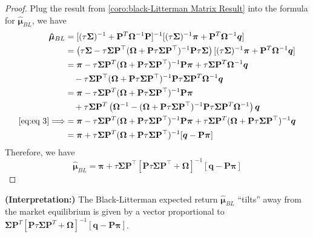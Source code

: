 \documentclass[13pt]{article}
\theoremstyle{definition}
\theoremstyle{remark}
\newenvironment{remark}
  {\pushQED{\qed}\renewcommand{\qedsymbol}{$\triangle$}\remarkx}
  {\popQED\endremarkx}
\begin{document}
\begin{proof}
Plug the result from   \cref{coro:black-Litterman Matrix Result} into the formula for $\bm{\hat{\bm{\mu}}}_{BL}$, we have
\begin{align*}
\bm{\hat{\bm{\mu}}}_{BL}
&=[(\tau \mathbf{\Sigma})^{-1}+\mathbf{P}^T\mathbf{\Omega}^{-1}\mathbf{P}]^{-1}[(\tau \mathbf{\Sigma})^{-1}\bm{\pi} + \mathbf{P}^T\mathbf{\Omega}^{-1}\bm{q}]\\
&=\left(\tau \mathbf{\Sigma}-\tau \mathbf{\Sigma} \mathbf{P}^\top (\mathbf{\Omega}+\mathbf{P}\tau \mathbf{\Sigma} \mathbf{P}^\top)^{-1} \mathbf{P} \tau \mathbf{\Sigma} \right)[(\tau \mathbf{\Sigma})^{-1}\bm{\pi} + \mathbf{P}^T\mathbf{\Omega}^{-1}\bm{q}]\\
&=\bm{\pi} - \tau \mathbf{\Sigma} \mathbf{P}^T(\mathbf{\Omega}+\mathbf{P}\tau \mathbf{\Sigma} \mathbf{P}^\top)^{-1}\mathbf{P}\bm{\pi}+ \tau \mathbf{\Sigma} \mathbf{P}^T\mathbf{\Omega}^{-1}\bm{q}\\
&\quad - \tau \mathbf{\Sigma} \mathbf{P}^\top (\mathbf{\Omega}+\mathbf{P}\tau \mathbf{\Sigma} \mathbf{P}^\top)^{-1} \mathbf{P} \tau \mathbf{\Sigma} \mathbf{P}^T\mathbf{\Omega}^{-1}\bm{q}\\
&=\bm{\pi} - \tau \mathbf{\Sigma} \mathbf{P}^T(\mathbf{\Omega}+\mathbf{P}\tau \mathbf{\Sigma} \mathbf{P}^\top)^{-1}\mathbf{P}\bm{\pi}\\
&\quad + \tau \mathbf{\Sigma} \mathbf{P}^T\left(\mathbf{\Omega}^{-1}-(\mathbf{\Omega}+\mathbf{P}\tau \mathbf{\Sigma} \mathbf{P}^\top)^{-1} \mathbf{P} \tau \mathbf{\Sigma} \mathbf{P}^T\mathbf{\Omega}^{-1}\right)\bm{q} \\
\cref{eq:eq 3}\Longrightarrow &=\bm{\pi} - \tau \mathbf{\Sigma} \mathbf{P}^T(\mathbf{\Omega}+\mathbf{P}\tau \mathbf{\Sigma} \mathbf{P}^\top)^{-1}\mathbf{P}\bm{\pi}+ \tau \mathbf{\Sigma} \mathbf{P}^T(\mathbf{\Omega}+\mathbf{P}\tau \mathbf{\Sigma} \mathbf{P}^\top)^{-1}\bm{q} \\
&=\bm{\pi}+\tau\mathbf{\Sigma} \mathbf{P}^T(\mathbf{\Omega}+\mathbf{P}\tau \mathbf{\Sigma} \mathbf{P}^\top)^{-1}[\bm{q}-\mathbf{P}\bm{\pi}]
\end{align*}
Therefore, we have
\[
\bm{\hat{\bm{\mu}}}_{BL}=\bm{\pi}+\tau \mathbf{\Sigma} \mathbf{P}^\top\left[\mathbf{P} \tau \mathbf{\Sigma} \mathbf{P}^\top+\mathbf{\Omega}\right]^{-1}[\bm{q}-\mathbf{P} \bm{\pi}]
\]
\end{proof}

\begin{remark}
    \textbf{(Interpretation:)} The Black-Litterman expected return $\bm{\hat{\bm{\mu}}}_{BL}$ ``tilts'' away  from the market equilibrium is given by a vector proportional to $\mathbf{\Sigma} \mathbf{P}^T[\mathbf{P}\tau \mathbf{\Sigma} \mathbf{P}^T+\mathbf{\Omega}]^{-1}[\bm{q}-\mathbf{P}\bm{\pi}]$. 
\end{remark}
\end{document}
